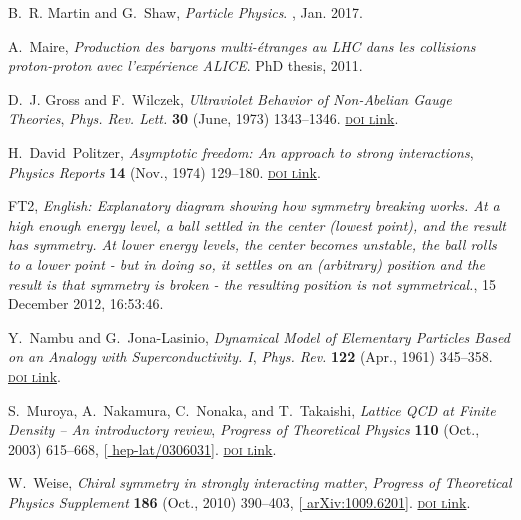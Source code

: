 \documentclass[ALICE,manyauthors]{cernphprep}
\begin{document}
\begin{thebibliography}{100}
B.~R. Martin and G.~Shaw, {\em Particle {{Physics}}}.
, Jan. 2017.

A.~Maire, {\em {Production des baryons multi-\'etranges au LHC dans les
  collisions proton-proton avec l'exp\'erience ALICE}}.
\newblock PhD thesis, 2011.

D.~J. Gross and F.~Wilczek, {\it Ultraviolet {{Behavior}} of {{Non-Abelian
  Gauge Theories}}},  {\textsl{Phys. Rev. Lett.}} {\footnotesize \bf 30} (June,
  1973) 1343--1346.
  \href{http://dx.doi.org/10.1103/PhysRevLett.30.1343}{\footnotesize
  \textrm{\textsc{doi l}ink}}.

H.~David~Politzer, {\it Asymptotic freedom: {{An}} approach to strong
  interactions},  {\textsl{Physics Reports}} {\footnotesize \bf 14} (Nov.,
  1974) 129--180.
  \href{http://dx.doi.org/10.1016/0370-1573(74)90014-3}{\footnotesize
  \textrm{\textsc{doi l}ink}}.

{FT2}, {\it English: {{Explanatory}} diagram showing how symmetry breaking
  works. {{At}} a high enough energy level, a ball settled in the center
  (lowest point), and the result has symmetry. {{At}} lower energy levels, the
  center becomes unstable, the ball rolls to a lower point - but in doing so,
  it settles on an (arbitrary) position and the result is that symmetry is
  broken - the resulting position is not symmetrical.},  15 December 2012,
  16:53:46.

Y.~Nambu and G.~{Jona-Lasinio}, {\it Dynamical {{Model}} of {{Elementary
  Particles Based}} on an {{Analogy}} with {{Superconductivity}}. {{I}}},
  {\textsl{Phys. Rev.}} {\footnotesize \bf 122} (Apr., 1961) 345--358.
  \href{http://dx.doi.org/10.1103/PhysRev.122.345}{\footnotesize
  \textrm{\textsc{doi l}ink}}.

S.~Muroya, A.~Nakamura, C.~Nonaka, and T.~Takaishi, {\it Lattice {{QCD}} at
  {{Finite Density}} -- {{An}} introductory review},  {\textsl{Progress of
  Theoretical Physics}} {\footnotesize \bf 110} (Oct., 2003) 615--668,
  [\href{https://arxiv.org/abs/hep-lat/0306031}{{\footnotesize
  hep-lat/0306031}}].
  \href{http://dx.doi.org/10.1143/PTP.110.615}{\footnotesize
  \textrm{\textsc{doi l}ink}}.

W.~Weise, {\it Chiral symmetry in strongly interacting matter},
  {\textsl{Progress of Theoretical Physics Supplement}} {\footnotesize \bf 186}
  (Oct., 2010) 390--403, [\href{https://arxiv.org/abs/1009.6201}{{\footnotesize
  arXiv:1009.6201}}].
  \href{http://dx.doi.org/10.1143/PTPS.186.390}{\footnotesize
  \textrm{\textsc{doi l}ink}}.


\end{thebibliography}
\end{document}
